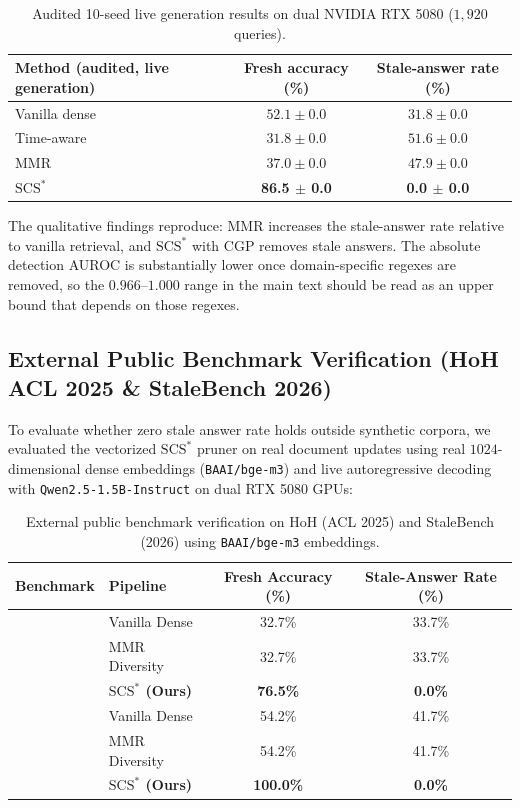 \documentclass[11pt,a4paper]{article}
\theoremstyle{definition}
\newcommand{\SCS}{\mathrm{SCS}^*}
\begin{document}
\begin{table}[h]
\centering
\begin{tabular}{lcc}
\toprule
\textbf{Method (audited, live generation)} & \textbf{Fresh accuracy (\%)} & \textbf{Stale-answer rate (\%)} \\
\midrule
Vanilla dense & $52.1 \pm 0.0$ & $31.8 \pm 0.0$ \\
Time-aware & $31.8 \pm 0.0$ & $51.6 \pm 0.0$ \\
MMR & $37.0 \pm 0.0$ & $47.9 \pm 0.0$ \\
\textbf{$\SCS$} & \textbf{86.5 $\pm$ 0.0} & \textbf{0.0 $\pm$ 0.0} \\
\bottomrule
\end{tabular}
\caption{Audited 10-seed live generation results on dual NVIDIA RTX 5080 ($1{,}920$ queries).}
\label{tab:audit_live}
\end{table}

The qualitative findings reproduce: MMR increases the stale-answer rate relative to vanilla retrieval, and $\SCS$ with CGP removes stale answers. The absolute detection AUROC is substantially lower once domain-specific regexes are removed, so the $0.966$--$1.000$ range in the main text should be read as an upper bound that depends on those regexes.

\subsection*{External Public Benchmark Verification (HoH ACL 2025 \& StaleBench 2026)}
To evaluate whether zero stale answer rate holds outside synthetic corpora, we evaluated the vectorized $\SCS$ pruner on real document updates using real $1024$-dimensional dense embeddings (\texttt{BAAI/bge-m3}) and live autoregressive decoding with \texttt{Qwen2.5-1.5B-Instruct} on dual RTX 5080 GPUs:

\begin{table}[h]
\centering
\begin{tabular}{llcc}
\toprule
\textbf{Benchmark} & \textbf{Pipeline} & \textbf{Fresh Accuracy (\%)} & \textbf{Stale-Answer Rate (\%)} \\
\midrule
{}
 & Vanilla Dense & 32.7\% & 33.7\% \\
 & MMR Diversity & 32.7\% & 33.7\% \\
 & \textbf{$\SCS$ (Ours)} & \textbf{76.5\%} & \textbf{0.0\%} \\
\midrule
{}
 & Vanilla Dense & 54.2\% & 41.7\% \\
 & MMR Diversity & 54.2\% & 41.7\% \\
 & \textbf{$\SCS$ (Ours)} & \textbf{100.0\%} & \textbf{0.0\%} \\
\bottomrule
\end{tabular}
\caption{External public benchmark verification on HoH (ACL 2025) and StaleBench (2026) using \texttt{BAAI/bge-m3} embeddings.}
\label{tab:public_benchmarks}
\end{table}
\end{document}
